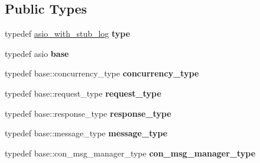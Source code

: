 \subsection*{Public Types}
\begin{DoxyCompactItemize}
\item 
\mbox{\label{structfc_1_1http_1_1detail_1_1asio__with__stub__log_a9cb29bb6af0b6c906e7c2fc65d9c36f6}} 
typedef \mbox{\hyperlink{structfc_1_1http_1_1detail_1_1asio__with__stub__log}{asio\+\_\+with\+\_\+stub\+\_\+log}} {\bfseries type}
\item 
\mbox{\label{structfc_1_1http_1_1detail_1_1asio__with__stub__log_a60fca1c1c06b5ea3d3d461d40965679d}} 
typedef asio {\bfseries base}
\item 
\mbox{\label{structfc_1_1http_1_1detail_1_1asio__with__stub__log_aa465d4a2681993cdc9daeb0f799b87c5}} 
typedef base\+::concurrency\+\_\+type {\bfseries concurrency\+\_\+type}
\item 
\mbox{\label{structfc_1_1http_1_1detail_1_1asio__with__stub__log_ada5bfac2cc37eb0f2a3497dad5588b08}} 
typedef base\+::request\+\_\+type {\bfseries request\+\_\+type}
\item 
\mbox{\label{structfc_1_1http_1_1detail_1_1asio__with__stub__log_a09520efc59da9cca2d1081f7c213f4c5}} 
typedef base\+::response\+\_\+type {\bfseries response\+\_\+type}
\item 
\mbox{\label{structfc_1_1http_1_1detail_1_1asio__with__stub__log_ada00b691b9a3c9661881a9a00aa7b169}} 
typedef base\+::message\+\_\+type {\bfseries message\+\_\+type}
\item 
\mbox{\label{structfc_1_1http_1_1detail_1_1asio__with__stub__log_af4d6d337482bb0a822ed03b2a67ff06a}} 
typedef base\+::con\+\_\+msg\+\_\+manager\+\_\+type {\bfseries con\+\_\+msg\+\_\+manager\+\_\+type}
\item 
\mbox{\label{structfc_1_1http_1_1detail_1_1asio__with__stub__log_abf17f51787a9c0455999609bbcb23a1c}} 

\end{DoxyCompactItemize}

